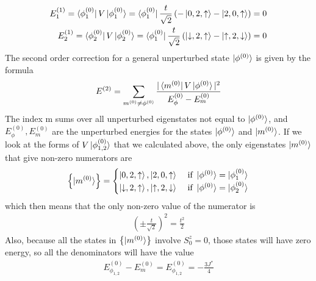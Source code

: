 \documentclass[twoside,11pt]{report}
\numberwithin{equation}{section}
\begin{document}
\begin{equation}\begin{aligned}
	E_1^{(1)} = \bra{\phi_1^{(0)}} V \ket{\phi_1^{(0)}} = \bra{\phi_1^{(0)}}\frac{t}{\sqrt 2}\left(-\ket{0, 2 ,\uparrow} - \ket{2, 0, \uparrow}\right)  = 0\\
	E_2^{(1)} = \bra{\phi_2^{(0)}} V \ket{\phi_2^{(0)}} = \bra{\phi_1^{(0)}}\frac{t}{\sqrt 2}\left(\ket{\downarrow, 2 ,\uparrow} - \ket{\uparrow, 2, \downarrow}\right)  = 0
\end{aligned}\end{equation}
The second order correction for a general unperturbed state \(\ket{\phi^{(0)}}\) is given by the formula
\begin{equation}\begin{aligned}
	E^{(2)} = \sum_{m^{(0)}\neq\phi^{(0)}}\frac{|\bra{m^{(0)}}V\ket{\phi^{(0)}}|^2}{E^{(0)}_\phi - E^{(0)}_m}
\end{aligned}\end{equation}
The index m sums over all unperturbed eigenstates not equal to \(\ket{\phi^{(0)}}\), and \(E^{(0)}_\phi, E^{(0)}_m\) are the unperturbed energies for the states \(\ket{\phi^{(0)}}\) and \(\ket{m^{(0)}}\). If we look at the forms of \(V\ket{\phi_{1,2}^{(0)}}\) that we calculated above, the only eigenstates \(\ket{m^{(0)}}\) that give non-zero numerators are
\begin{equation}\begin{aligned}
	\left\{\ket{m^{(0)}}\right\} = \begin{cases}
		\ket{0, 2 ,\uparrow}, \ket{2, 0, \uparrow} & \text{ if }\ket{\phi^{(0)}} = \ket{\phi_1^{(0)}} \\
		\ket{\downarrow, 2 ,\uparrow}, \ket{\uparrow, 2, \downarrow} & \text{ if }\ket{\phi^{(0)}} = \ket{\phi_2^{(0)}}\\
	\end{cases}
\end{aligned}\end{equation}
which then means that the only non-zero value of the numerator is
\begin{equation}\begin{aligned}
	\left( \pm \frac{t}{\sqrt 2} \right) ^2 = \frac{t^2}{2}
\end{aligned}\end{equation}
Also, because all the states in \(\left\{ \ket{m^{(0)}} \right\} \) involve \(S_0^z = 0\), those states will have zero energy, so all the denominators will have the value
\begin{equation}\begin{aligned}
	E_{\phi_{1,2}}^{(0)} - E_m^{(0)} = E_{\phi_{1,2}}^{(0)} = -\frac{3J^*}{4}
\end{aligned}\end{equation}
\end{document}
